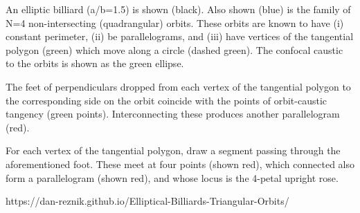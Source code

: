 An elliptic billiard (a/b=1.5) is shown (black). Also shown (blue) is the family of N=4 non-intersecting (quadrangular) orbits. These orbits are known to have (i) constant perimeter, (ii) be parallelograms, and (iii) have vertices of the tangential polygon (green) which move along a circle (dashed green). The confocal caustic to the orbits is shown as the green ellipse.

The feet of perpendiculars dropped from each vertex of the tangential polygon to the corresponding side on the orbit coincide with the points of orbit-caustic tangency (green points). Interconnecting these produces another parallelogram (red).

For each vertex of the tangential polygon, draw a segment passing through the aforementioned foot. These meet at four points (shown red), which connected also form a parallelogram (shown red), and whose locus is the 4-petal upright rose.

https://dan-reznik.github.io/Elliptical-Billiards-Triangular-Orbits/